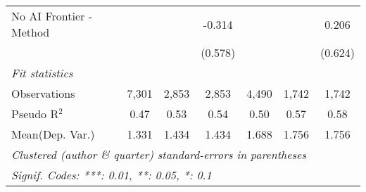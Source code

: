\begin{tabular}{lcccccc}
   No AI Frontier - Method &              &              & -0.314      &              &         & 0.206\\   
                           &              &              & (0.578)     &              &         & (0.624)\\   
   \midrule
   \emph{Fit statistics}\\
   Observations            & 7,301        & 2,853        & 2,853       & 4,490        & 1,742   & 1,742\\  
   Pseudo R$^2$            & 0.47         & 0.53         & 0.54        & 0.50         & 0.57    & 0.58\\  
Mean(Dep. Var.) & 1.331 & 1.434 & 1.434 & 1.688 & 1.756 & 1.756 \\
   \midrule \midrule
   \multicolumn{7}{l}{\emph{Clustered (author \& quarter) standard-errors in parentheses}}\\
   \multicolumn{7}{l}{\emph{Signif. Codes: ***: 0.01, **: 0.05, *: 0.1}}\\
\end{tabular}
\par\endgroup
